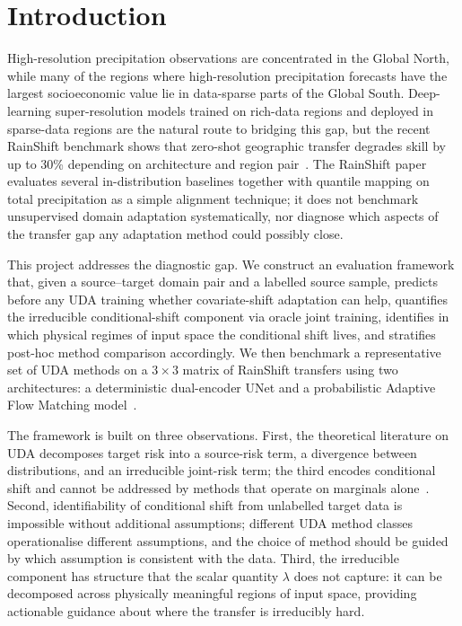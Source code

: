 \documentclass{article}
\begin{document}
\section{Introduction}

High-resolution precipitation observations are concentrated in the
Global North, while many of the regions where high-resolution
precipitation forecasts have the largest socioeconomic value lie in
data-sparse parts of the Global South. Deep-learning super-resolution
models trained on rich-data regions and deployed in sparse-data regions
are the natural route to bridging this gap, but the recent RainShift
benchmark shows that zero-shot geographic transfer degrades skill by up
to 30\% depending on architecture and region pair~\citep{harder2025rainshift}.
The RainShift paper evaluates several in-distribution baselines together
with quantile mapping on total precipitation as a simple alignment
technique; it does not benchmark unsupervised domain adaptation
systematically, nor diagnose which aspects of the transfer gap any
adaptation method could possibly close.

This project addresses the diagnostic gap. We construct an evaluation
framework that, given a source--target domain pair and a labelled source
sample, predicts before any UDA training whether covariate-shift
adaptation can help, quantifies the irreducible conditional-shift
component via oracle joint training, identifies in which physical
regimes of input space the conditional shift lives, and stratifies
post-hoc method comparison accordingly. We then benchmark a
representative set of UDA methods on a $3\times 3$ matrix of RainShift
transfers using two architectures: a deterministic dual-encoder UNet
and a probabilistic Adaptive Flow Matching
model~\citep{fotiadis2025adaptive}.

The framework is built on three observations. First, the theoretical
literature on UDA decomposes target risk into a source-risk term, a
divergence between distributions, and an irreducible joint-risk term;
the third encodes conditional shift and cannot be addressed by methods
that operate on marginals
alone~\citep{bendavid2010theory,redko2017theoretical}. Second,
identifiability of conditional shift from unlabelled target data is
impossible without additional assumptions; different UDA method classes
operationalise different assumptions, and the choice of method should
be guided by which assumption is consistent with the data. Third, the
irreducible component has structure that the scalar quantity $\lambda$
does not capture: it can be decomposed across physically meaningful
regions of input space, providing actionable guidance about where the
transfer is irreducibly hard.
\end{document}
